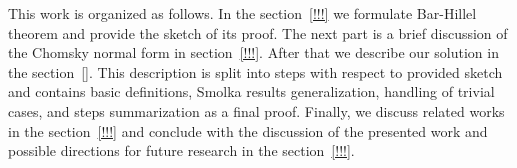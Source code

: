 This work is organized as follows.
In the section~\ref{!!!} we formulate Bar-Hillel theorem and provide the sketch of its proof.
The next part is a brief discussion of the Chomsky normal form in section~\ref{!!!}.
After that we describe our solution in the section~\ref{}.
This description is split into steps with respect to provided sketch and contains basic definitions, Smolka results generalization, handling of trivial cases, and steps summarization as a final proof.
Finally, we discuss related works in the section~\ref{!!!} and conclude with the discussion of the presented work and possible directions for future research in the section~\ref{!!!}.


